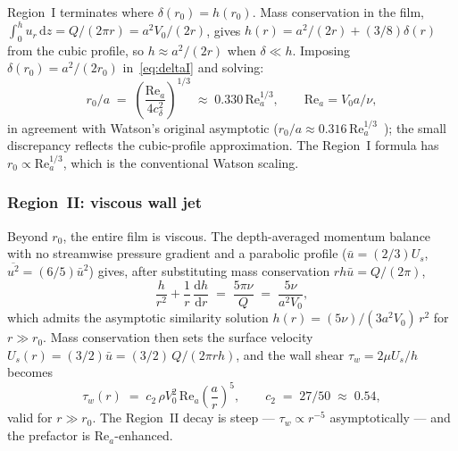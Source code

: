\documentclass[aps,prfluids,reprint,amsmath,amssymb,floatfix]{revtex4-2}
\newcommand{\Rey}{\mathrm{Re}}
\newcommand{\dd}{\mathrm{d}}
\begin{document}
Region~I terminates where $\delta(r_0) = h(r_0)$. Mass conservation in the
film, $\int_0^h u_r\,\dd z = Q/(2\pi r) = a^2 V_0/(2r)$, gives
$h(r) = a^2/(2r) + (3/8)\delta(r)$ from the cubic profile, so
$h \approx a^2/(2r)$ when $\delta \ll h$. Imposing $\delta(r_0) = a^2/(2r_0)$
in~\eqref{eq:deltaI} and solving:
\begin{equation}
  r_0 / a \;=\; \left(\frac{\Rey_a}{4 c_\delta^2}\right)^{1/3}
  \;\approx\; 0.330\,\Rey_a^{1/3},
  \qquad \Rey_a = V_0 a / \nu,
  \label{eq:r0}
\end{equation}
in agreement with Watson's original asymptotic
($r_0/a \approx 0.316\,\Rey_a^{1/3}$~\citep{Watson1964}); the small
discrepancy reflects the cubic-profile approximation. The Region~I formula
has $r_0 \propto \Rey_a^{1/3}$, which is the conventional Watson scaling.

\subsubsection{Region~II: viscous wall jet}

Beyond $r_0$, the entire film is viscous. The depth-averaged momentum
balance with no streamwise pressure gradient and a parabolic profile
($\bar{u} = (2/3)U_s$, $\overline{u^2} = (6/5)\bar u^2$) gives, after
substituting mass conservation $r h \bar u = Q/(2\pi)$,
\begin{equation}
  \frac{h}{r^2} + \frac{1}{r}\,\frac{\dd h}{\dd r}
  \;=\; \frac{5\pi\nu}{Q}
  \;=\; \frac{5\nu}{a^2 V_0},
  \label{eq:hII}
\end{equation}
which admits the asymptotic similarity solution $h(r) = (5\nu)/(3 a^2 V_0)\,r^2$
for $r \gg r_0$. Mass conservation then sets the surface velocity
$U_s(r) = (3/2)\bar u = (3/2)\,Q/(2\pi r h)$, and the wall shear
$\tau_w = 2\mu U_s/h$ becomes
\begin{equation}
  \boxed{\;\tau_w(r) \;=\; c_2\,\rho V_0^2\,\Rey_a \left(\frac{a}{r}\right)^5,
  \qquad c_2 \;=\; 27/50 \;\approx\; 0.54,\;}
  \label{eq:tauII}
\end{equation}
valid for $r \gg r_0$. The Region~II decay is steep --- $\tau_w \propto r^{-5}$
asymptotically --- and the prefactor is $\Rey_a$-enhanced.
\end{document}
